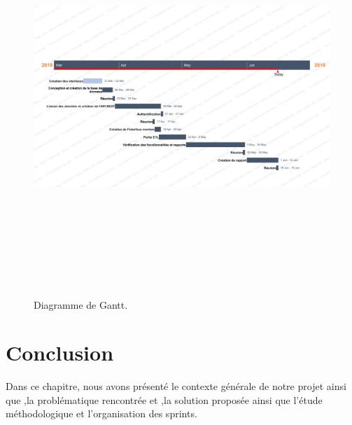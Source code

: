 \begin{figure}[H]

\begin{center}
\includegraphics[width=17cm,height=15cm]{./figures/gantt.png}
\caption{Diagramme de Gantt.}
\end{center}
\end {figure}

\section{Conclusion}

Dans ce chapitre, nous avons présenté le contexte générale de notre projet ainsi que
,la problématique rencontrée et ,la solution proposée ainsi que l'étude méthodologique et l'organisation des sprints.

